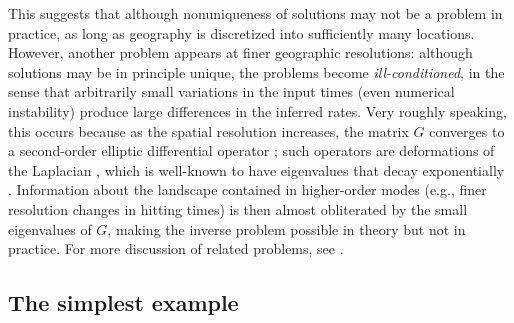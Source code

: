 \documentclass{article}
\begin{document}
This suggests that although nonuniqueness of solutions may not be a problem in practice,
as long as geography is discretized into sufficiently many locations.
However, another problem appears at finer geographic resolutions:
although solutions may be in principle unique,
the problems become \emph{ill-conditioned}, 
in the sense that arbitrarily small variations in the input times
(even numerical instability)
produce large differences in the inferred rates.
Very roughly speaking, this occurs because as the spatial resolution increases,
the matrix $G$ converges to a second-order elliptic differential operator \citep{pde};
such operators are deformations of the Laplacian \citep{laplacian},
which is well-known to have eigenvalues that decay exponentially \citep{laplacian_eigenvals}.
Information about the landscape contained in higher-order modes
(e.g., finer resolution changes in hitting times)
is then almost obliterated by the small eigenvalues of $G$,
making the inverse problem possible in theory but not in practice.
For more discussion of related problems, see \citet{badtruth,shape_of_a_pop,inverse_prob}.

\subsection*{The simplest example}
\end{document}
